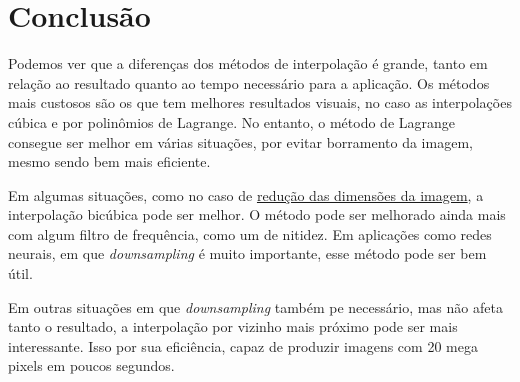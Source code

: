 \section{Conclusão}

Podemos ver que a diferenças dos métodos de interpolação é grande, tanto em relação ao resultado quanto ao tempo necessário para a aplicação. Os métodos mais custosos são os que tem melhores resultados visuais, no caso as interpolações cúbica e por polinômios de Lagrange. No entanto, o método de Lagrange consegue ser melhor em várias situações, por evitar borramento da imagem, mesmo sendo bem mais eficiente.

Em algumas situações, como no caso de \hyperref[sec:escalonamento]{redução das dimensões da imagem}, a interpolação bicúbica pode ser melhor. O método pode ser melhorado ainda mais com algum filtro de frequência, como um de nitidez. Em aplicações como redes neurais, em que \textit{downsampling} é muito importante, esse método pode ser bem útil.

Em outras situações em que \textit{downsampling} também pe necessário, mas não afeta tanto o resultado, a interpolação por vizinho mais próximo pode ser mais interessante. Isso por sua eficiência, capaz de produzir imagens com 20 mega pixels em poucos segundos.
